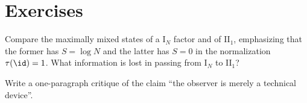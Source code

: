 \section*{Exercises}
\begin{exercise}
Compare the maximally mixed states of a I$_N$ factor and of II$_1$, emphasizing that the former has $S=\log N$ and the latter has $S=0$ in the normalization $\tau(\id)=1$. What information is lost in passing from I$_N$ to II$_1$?
\end{exercise}
\begin{exercise}
Write a one-paragraph critique of the claim ``the observer is merely a technical device''.
\end{exercise}

